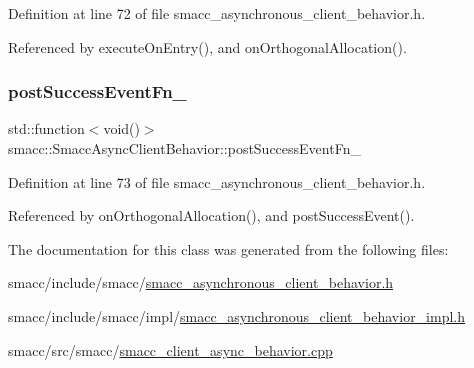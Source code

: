 Definition at line 72 of file smacc\+\_\+asynchronous\+\_\+client\+\_\+behavior.\+h.



Referenced by execute\+On\+Entry(), and on\+Orthogonal\+Allocation().

\mbox{\label{classsmacc_1_1SmaccAsyncClientBehavior_a944ed10880796d53649bee39dc1299c0}} 
\subsubsection{\texorpdfstring{post\+Success\+Event\+Fn\+\_\+}{postSuccessEventFn\_}}
{\footnotesize\ttfamily std\+::function$<$void()$>$ smacc\+::\+Smacc\+Async\+Client\+Behavior\+::post\+Success\+Event\+Fn\+\_\+\hspace{0.3cm}{\ttfamily [private]}}



Definition at line 73 of file smacc\+\_\+asynchronous\+\_\+client\+\_\+behavior.\+h.



Referenced by on\+Orthogonal\+Allocation(), and post\+Success\+Event().



The documentation for this class was generated from the following files\+:\begin{DoxyCompactItemize}
\item 
smacc/include/smacc/\hyperlink{smacc__asynchronous__client__behavior_8h}{smacc\+\_\+asynchronous\+\_\+client\+\_\+behavior.\+h}\item 
smacc/include/smacc/impl/\hyperlink{smacc__asynchronous__client__behavior__impl_8h}{smacc\+\_\+asynchronous\+\_\+client\+\_\+behavior\+\_\+impl.\+h}\item 
smacc/src/smacc/\hyperlink{smacc__client__async__behavior_8cpp}{smacc\+\_\+client\+\_\+async\+\_\+behavior.\+cpp}\end{DoxyCompactItemize}
